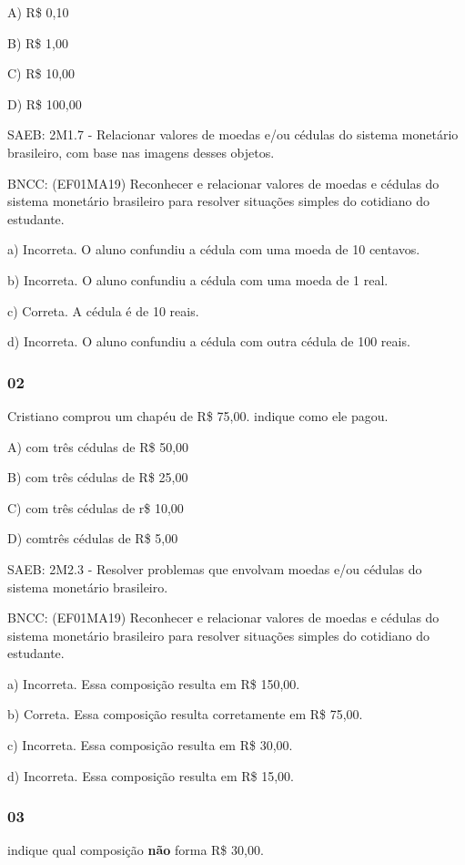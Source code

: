 A) R\$ 0,10

B) R\$ 1,00

C) R\$ 10,00

D) R\$ 100,00

SAEB: 2M1.7 - Relacionar valores de moedas e/ou cédulas do sistema
monetário brasileiro, com base nas imagens desses objetos.

BNCC: (EF01MA19) Reconhecer e relacionar valores de moedas e cédulas do
sistema monetário brasileiro para resolver situações simples do
cotidiano do estudante.

a) Incorreta. O aluno confundiu a cédula com uma moeda de 10 centavos.

b) Incorreta. O aluno confundiu a cédula com uma moeda de 1 real.

c) Correta. A cédula é de 10 reais.

d) Incorreta. O aluno confundiu a cédula com outra cédula de 100 reais.

\subsubsection{02}\label{section-61}

Cristiano comprou um chapéu de R\$ 75,00. indique como ele pagou.

A) com três cédulas de R\$ 50,00

B) com três cédulas de R\$ 25,00

C) com três cédulas de r\$ 10,00

D) comtrês cédulas de R\$ 5,00

SAEB: 2M2.3 - Resolver problemas que envolvam moedas e/ou cédulas do
sistema monetário brasileiro.

BNCC: (EF01MA19) Reconhecer e relacionar valores de moedas e cédulas do
sistema monetário brasileiro para resolver situações simples do
cotidiano do estudante.

a) Incorreta. Essa composição resulta em R\$ 150,00.

b) Correta. Essa composição resulta corretamente em R\$ 75,00.

c) Incorreta. Essa composição resulta em R\$ 30,00.

d) Incorreta. Essa composição resulta em R\$ 15,00.

\subsubsection{03}\label{section-62}

indique qual composição \textbf{não} forma R\$ 30,00.

